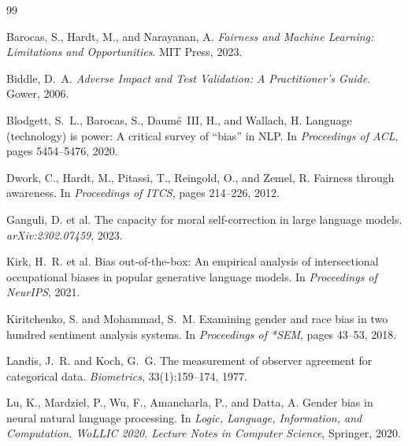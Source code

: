 \documentclass{article}
\begin{document}
{\small

\begin{thebibliography}{99}

Barocas, S., Hardt, M., and Narayanan, A.
\newblock \textit{Fairness and Machine Learning: Limitations and Opportunities}.
\newblock MIT Press, 2023.

Biddle, D.~A.
\newblock \textit{Adverse Impact and Test Validation: A Practitioner's Guide}.
\newblock Gower, 2006.

Blodgett, S.~L., Barocas, S., Daum\'{e}~III, H., and Wallach, H.
\newblock Language (technology) is power: A critical survey of ``bias'' in NLP.
\newblock In \textit{Proceedings of ACL}, pages 5454--5476, 2020.

Dwork, C., Hardt, M., Pitassi, T., Reingold, O., and Zemel, R.
\newblock Fairness through awareness.
\newblock In \textit{Proceedings of ITCS}, pages 214--226, 2012.

Ganguli, D. et al.
\newblock The capacity for moral self-correction in large language models.
\newblock \textit{arXiv:2302.07459}, 2023.

Kirk, H.~R. et al.
\newblock Bias out-of-the-box: An empirical analysis of intersectional
  occupational biases in popular generative language models.
\newblock In \textit{Proceedings of NeurIPS}, 2021.

Kiritchenko, S. and Mohammad, S.~M.
\newblock Examining gender and race bias in two hundred sentiment analysis
  systems.
\newblock In \textit{Proceedings of *SEM}, pages 43--53, 2018.

Landis, J.~R. and Koch, G.~G.
\newblock The measurement of observer agreement for categorical data.
\newblock \textit{Biometrics}, 33(1):159--174, 1977.

Lu, K., Mardziel, P., Wu, F., Amancharla, P., and Datta, A.
\newblock Gender bias in neural natural language processing.
\newblock In \textit{Logic, Language, Information, and Computation.
  WoLLIC 2020. Lecture Notes in Computer Science}, Springer, 2020.


\end{thebibliography}}
\end{document}
